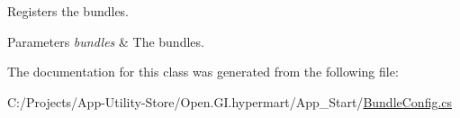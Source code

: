 Registers the bundles. 


\begin{DoxyParams}{Parameters}
{\em bundles} & The bundles.\\
\hline
\end{DoxyParams}


The documentation for this class was generated from the following file\+:\begin{DoxyCompactItemize}
\item 
C\+:/\+Projects/\+App-\/\+Utility-\/\+Store/\+Open.\+G\+I.\+hypermart/\+App\+\_\+\+Start/\hyperlink{_bundle_config_8cs}{Bundle\+Config.\+cs}\end{DoxyCompactItemize}
